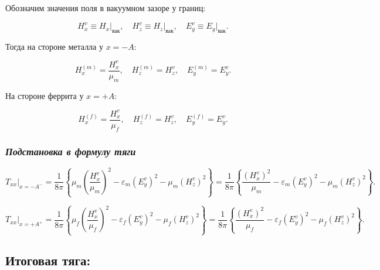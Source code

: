 \documentclass[11pt]{article}
\begin{document}
Обозначим значения поля в вакуумном зазоре у границ:

\begin{equation*}
    H_x^v \equiv H_x\big|_{\text{вак}},\quad
    H_z^v \equiv H_z\big|_{\text{вак}},\quad
    E_y^v \equiv E_y\big|_{\text{вак}}.
\end{equation*}

Тогда на стороне металла у \(x=-A\):

\begin{equation*}
    H_x^{(m)} = \frac{H_x^v}{\mu_m},\quad
    H_z^{(m)} = H_z^v,\quad
    E_y^{(m)} = E_y^v.
\end{equation*}

На стороне феррита у \(x=+A\):

\begin{equation*}
    H_x^{(f)} = \frac{H_x^v}{\mu_f},\quad
    H_z^{(f)} = H_z^v,\quad
    E_y^{(f)} = E_y^v.
\end{equation*}

\subsubsection{\texorpdfstring{\emph{Подстановка в формулу
тяги}}{Подстановка в формулу тяги}}\label{ux43fux43eux434ux441ux442ux430ux43dux43eux432ux43aux430-ux432-ux444ux43eux440ux43cux443ux43bux443-ux442ux44fux433ux438}

\begin{equation*}
    T_{xx}\big|_{x=-A^-}
    = \frac{1}{8\pi}\left\{
        \mu_m \left(\frac{H_x^v}{\mu_m}\right)^2
        - \varepsilon_m (E_y^v)^2
        - \mu_m (H_z^v)^2
    \right\}
    = \frac{1}{8\pi}\left\{
        \frac{(H_x^v)^2}{\mu_m}
        - \varepsilon_m (E_y^v)^2
        - \mu_m (H_z^v)^2
    \right\}.
\end{equation*}

\begin{equation*}
    T_{xx}\big|_{x=+A^+}
    = \frac{1}{8\pi}\left\{
        \mu_f \left(\frac{H_x^v}{\mu_f}\right)^2
        - \varepsilon_f (E_y^v)^2
        - \mu_f (H_z^v)^2
    \right\}
    = \frac{1}{8\pi}\left\{
        \frac{(H_x^v)^2}{\mu_f}
        - \varepsilon_f (E_y^v)^2
        - \mu_f (H_z^v)^2
    \right\}.
\end{equation*}

\subsection{Итоговая
тяга:}\label{ux438ux442ux43eux433ux43eux432ux430ux44f-ux442ux44fux433ux430}
\end{document}
